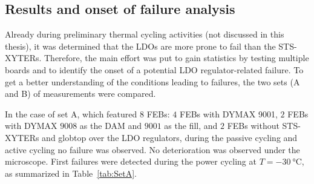 \subsection{Results and onset of failure analysis}
Already during preliminary thermal cycling activities (not discussed in this thesis), it was determined that the \glspl{LDO} are more prone to fail than the STS-XYTERs. Therefore, the main effort was put to gain statistics by testing multiple boards and to identify the onset of a potential \gls{LDO} regulator-related failure. To get a better understanding of the conditions leading to failures, the two sets (A and B) of measurements were compared. 


In the case of set A, which featured $8$ \glspl{FEB}: $4$ \glspl{FEB} with DYMAX 9001, $2$ \glspl{FEB} with DYMAX $9008$ as the DAM and $9001$ as the fill, and $2$ \glspl{FEB} without STS-XYTERs and globtop over the \gls{LDO} regulators, during the passive cycling and active cycling no failure was observed. No deterioration was observed under the microscope. First failures were detected during the power cycling at $T=\SI{-30}{\celsius}$, as summarized in Table~\ref{tab:SetA}. 

